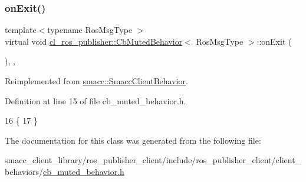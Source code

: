 \subsubsection{\texorpdfstring{on\+Exit()}{onExit()}}
{\footnotesize\ttfamily template$<$typename Ros\+Msg\+Type $>$ \\
virtual void \hyperlink{classcl__ros__publisher_1_1CbMutedBehavior}{cl\+\_\+ros\+\_\+publisher\+::\+Cb\+Muted\+Behavior}$<$ Ros\+Msg\+Type $>$\+::on\+Exit (\begin{DoxyParamCaption}{ }\end{DoxyParamCaption})\hspace{0.3cm}{\ttfamily [inline]}, {\ttfamily [override]}, {\ttfamily [virtual]}}



Reimplemented from \hyperlink{classsmacc_1_1SmaccClientBehavior_a7e4fb6ce81ff96dc172425852d69c0c5}{smacc\+::\+Smacc\+Client\+Behavior}.



Definition at line 15 of file cb\+\_\+muted\+\_\+behavior.\+h.


\begin{DoxyCode}
16     \{
17     \}
\end{DoxyCode}


The documentation for this class was generated from the following file\+:\begin{DoxyCompactItemize}
\item 
smacc\+\_\+client\+\_\+library/ros\+\_\+publisher\+\_\+client/include/ros\+\_\+publisher\+\_\+client/client\+\_\+behaviors/\hyperlink{cb__muted__behavior_8h}{cb\+\_\+muted\+\_\+behavior.\+h}\end{DoxyCompactItemize}
